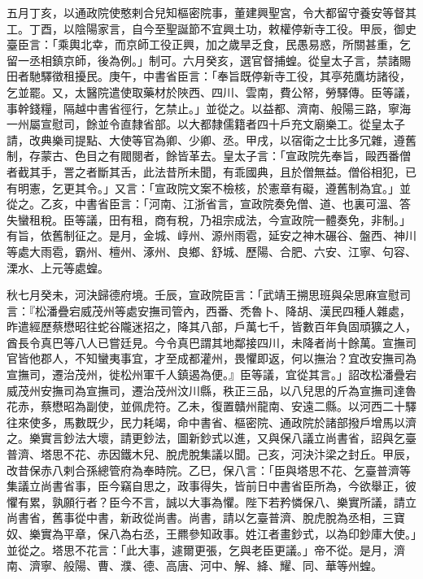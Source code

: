 \begin{pinyinscope}
 五月丁亥，以通政院使憨剌合兒知樞密院事，董建興聖宮，令大都留守養安等督其工。丁酉，以陰陽家言，自今至聖誕節不宜興土功，敕權停新寺工役。甲辰，御史臺臣言：「乘輿北幸，而京師工役正興，加之歲旱乏食，民愚易惑，所關甚重，乞留一丞相鎮京師，後為例。」制可。六月癸亥，選官督捕蝗。從皇太子言，禁諸賜田者馳驛徵租擾民。庚午，中書省臣言：「奉旨既停新寺工役，其亭苑鷹坊諸役，乞並罷。又，太醫院遣使取藥材於陜西、四川、雲南，費公帑，勞驛傳。臣等議，事幹錢糧，隔越中書省徑行，乞禁止。」並從之。以益都、濟南、般陽三路，寧海一州屬宣慰司，餘並令直隸省部。以大都隸儒籍者四十戶充文廟樂工。從皇太子請，改典樂司提點、大使等官為卿、少卿、丞。甲戌，以宿衛之士比多冗雜，遵舊制，存蒙古、色目之有閥閱者，餘皆革去。皇太子言：「宣政院先奉旨，毆西番僧者截其手，詈之者斷其舌，此法昔所未聞，有乖國典，且於僧無益。僧俗相犯，已有明憲，乞更其令。」又言：「宣政院文案不檢核，於憲章有礙，遵舊制為宜。」並從之。乙亥，中書省臣言：「河南、江浙省言，宣政院奏免僧、道、也裏可溫、答失蠻租稅。臣等議，田有租，商有稅，乃祖宗成法，今宣政院一體奏免，非制。」有旨，依舊制征之。是月，金城、崞州、源州雨雹，延安之神木碾谷、盤西、神川等處大雨雹，霸州、檀州、涿州、良鄉、舒城、歷陽、合肥、六安、江寧、句容、溧水、上元等處蝗。



 秋七月癸未，河決歸德府境。壬辰，宣政院臣言：「武靖王搠思班與朵思麻宣慰司言：『松潘疊宕威茂州等處安撫司管內，西番、禿魯卜、降胡、漢民四種人雜處，昨遣經歷蔡懋昭往蛇谷隴迷招之，降其八部，戶萬七千，皆數百年負固頑獷之人，酋長令真巴等八人已嘗廷見。今令真巴謂其地鄰接四川，未降者尚十餘萬。宣撫司官皆他郡人，不知蠻夷事宜，才至成都灌州，畏懼即返，何以撫治？宜改安撫司為宣撫司，遷治茂州，徙松州軍千人鎮遏為便。』臣等議，宜從其言。」詔改松潘疊宕威茂州安撫司為宣撫司，遷治茂州汶川縣，秩正三品，以八兒思的斤為宣撫司達魯花赤，蔡懋昭為副使，並佩虎符。乙未，復置贛州龍南、安遠二縣。以河西二十驛往來使多，馬數既少，民力耗竭，命中書省、樞密院、通政院於諸部撥戶增馬以濟之。樂實言鈔法大壞，請更鈔法，圖新鈔式以進，又與保八議立尚書省，詔與乞臺普濟、塔思不花、赤因鐵木兒、脫虎脫集議以聞。己亥，河決汴梁之封丘。甲辰，改昔保赤八剌合孫總管府為奉時院。乙巳，保八言：「臣與塔思不花、乞臺普濟等集議立尚書省事，臣今竊自思之，政事得失，皆前日中書省臣所為，今欲舉正，彼懼有累，孰願行者？臣今不言，誠以大事為懼。陛下若矜憐保八、樂實所議，請立尚書省，舊事從中書，新政從尚書。尚書，請以乞臺普濟、脫虎脫為丞相，三寶奴、樂實為平章，保八為右丞，王羆參知政事。姓江者畫鈔式，以為印鈔庫大使。」並從之。塔思不花言：「此大事，遽爾更張，乞與老臣更議。」帝不從。是月，濟南、濟寧、般陽、曹、濮、德、高唐、河中、解、絳、耀、同、華等州蝗。




\end{pinyinscope}
